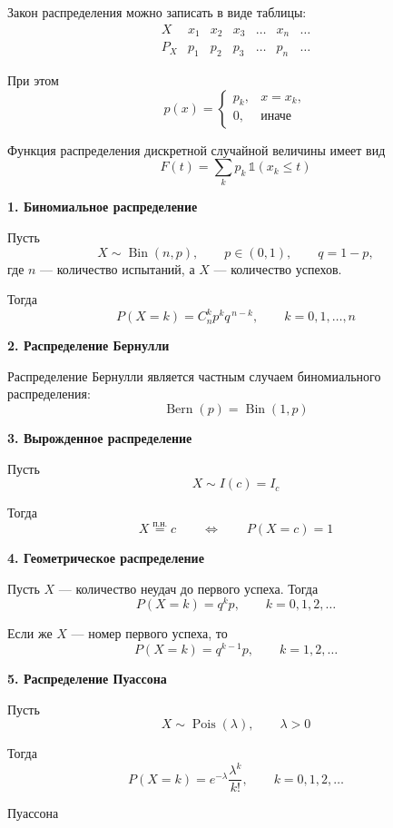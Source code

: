 \documentclass[12pt,a4paper]{article}
\begin{document}
Закон распределения можно записать в виде таблицы:
\[
\begin{array}{c|cccccc}
X & x_1 & x_2 & x_3 & \ldots & x_n & \ldots\\
\hline
P_X & p_1 & p_2 & p_3 & \ldots & p_n & \ldots
\end{array}
\]

При этом
\[
p(x)=
\begin{cases}
p_k, & x=x_k,\\
0, & \text{иначе}
\end{cases}
\]

Функция распределения дискретной случайной величины имеет вид
\[
F(t)=\sum_k p_k\,\mathds{1}(x_k\leq t)
\]

\begin{example}

\textbf{1. Биномиальное распределение}

Пусть
\[
X\sim \operatorname{Bin}(n,p),
\qquad
p\in(0,1),
\qquad
q=1-p,
\]
где $n$ --- количество испытаний, а $X$ --- количество успехов.

Тогда
\[
P(X=k)=C_n^k p^k q^{\,n-k},
\qquad
k=0,1,\ldots,n
\]

\medskip

\textbf{2. Распределение Бернулли}

Распределение Бернулли является частным случаем биномиального распределения:
\[
\operatorname{Bern}(p)=\operatorname{Bin}(1,p)
\]

\medskip

\textbf{3. Вырожденное распределение}

Пусть
\[
X\sim I(c)=I_c
\]

Тогда
\[
X\overset{\text{п.н.}}{=}c
\qquad\Longleftrightarrow\qquad
P(X=c)=1
\]

\medskip

\textbf{4. Геометрическое распределение}

Пусть $X$ --- количество неудач до первого успеха. Тогда
\[
P(X=k)=q^k p,
\qquad
k=0,1,2,\ldots
\]

Если же $X$ --- номер первого успеха, то
\[
P(X=k)=q^{k-1}p,
\qquad
k=1,2,\ldots
\]

\medskip

\textbf{5. Распределение Пуассона}

Пусть
\[
X\sim \operatorname{Pois}(\lambda),
\qquad
\lambda>0
\]

Тогда
\[
P(X=k)=e^{-\lambda}\frac{\lambda^k}{k!},
\qquad
k=0,1,2,\ldots
\]

\begin{theorem}{Пуассона}


\end{theorem}
\end{example}
\end{document}
